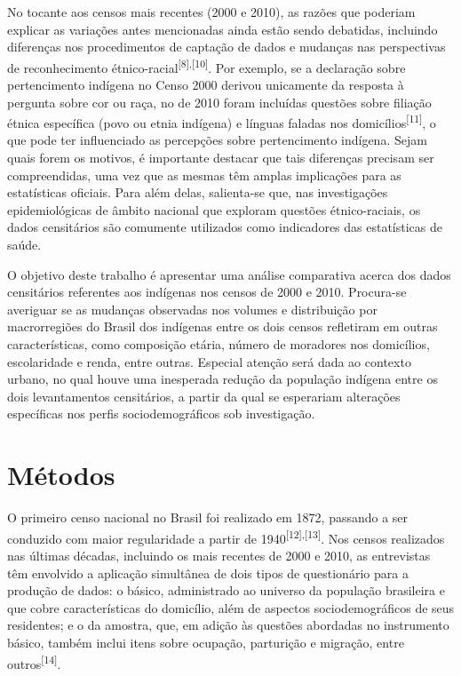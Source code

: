\documentclass{article}
\begin{document}
No tocante aos censos mais recentes (2000 e 2010), as razões que poderiam
explicar as variações antes mencionadas ainda estão sendo debatidas, incluindo
diferenças nos procedimentos de captação de dados e mudanças nas perspectivas de
reconhecimento étnico-racial\textsuperscript{[}\textsuperscript{8}\textsuperscript{]}\textsuperscript{,}\textsuperscript{[}\textsuperscript{10}\textsuperscript{]}. Por exemplo, se a declaração sobre pertencimento indígena no Censo 2000
derivou unicamente da resposta à pergunta sobre cor ou raça, no de 2010 foram
incluídas questões sobre filiação étnica específica (povo ou etnia indígena) e
línguas faladas nos domicílios\textsuperscript{[}\textsuperscript{11}\textsuperscript{]}, o que pode ter influenciado as percepções sobre pertencimento indígena. Sejam
quais forem os motivos, é importante destacar que tais diferenças precisam ser
compreendidas, uma vez que as mesmas têm amplas implicações para as estatísticas
oficiais. Para além delas, salienta-se que, nas investigações epidemiológicas de
âmbito nacional que exploram questões étnico-raciais, os dados censitários são
comumente utilizados como indicadores das estatísticas de saúde.

O objetivo deste trabalho é apresentar uma análise comparativa acerca dos dados
censitários referentes aos indígenas nos censos de 2000 e 2010. Procura-se
averiguar se as mudanças observadas nos volumes e distribuição por macrorregiões
do Brasil dos indígenas entre os dois censos refletiram em outras
características, como composição etária, número de moradores nos domicílios,
escolaridade e renda, entre outras. Especial atenção será dada ao contexto
urbano, no qual houve uma inesperada redução da população indígena entre os dois
levantamentos censitários, a partir da qual se esperariam alterações específicas
nos perfis sociodemográficos sob investigação.

\section{Métodos}

O primeiro censo nacional no Brasil foi realizado em 1872, passando a ser
conduzido com maior regularidade a partir de 1940\textsuperscript{[}\textsuperscript{12}\textsuperscript{]}\textsuperscript{,}\textsuperscript{[}\textsuperscript{13}\textsuperscript{]}. Nos censos realizados nas últimas décadas, incluindo os mais recentes de 2000
e 2010, as entrevistas têm envolvido a aplicação simultânea de dois tipos de
questionário para a produção de dados: o básico, administrado ao universo da
população brasileira e que cobre características do domicílio, além de aspectos
sociodemográficos de seus residentes; e o da amostra, que, em adição às questões
abordadas no instrumento básico, também inclui itens sobre ocupação, parturição
e migração, entre outros\textsuperscript{[}\textsuperscript{14}\textsuperscript{]}.
\end{document}
